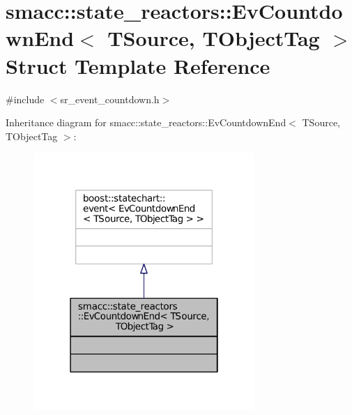 \hypertarget{structsmacc_1_1state__reactors_1_1EvCountdownEnd}{}\section{smacc\+:\+:state\+\_\+reactors\+:\+:Ev\+Countdown\+End$<$ T\+Source, T\+Object\+Tag $>$ Struct Template Reference}
\label{structsmacc_1_1state__reactors_1_1EvCountdownEnd}


{\ttfamily \#include $<$sr\+\_\+event\+\_\+countdown.\+h$>$}



Inheritance diagram for smacc\+:\+:state\+\_\+reactors\+:\+:Ev\+Countdown\+End$<$ T\+Source, T\+Object\+Tag $>$\+:
\nopagebreak
\begin{figure}[H]
\begin{center}
\leavevmode
\includegraphics[width=238pt]{structsmacc_1_1state__reactors_1_1EvCountdownEnd__inherit__graph}
\end{center}
\end{figure}


